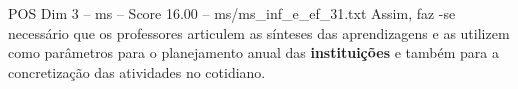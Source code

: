 \begin{textsample}{POS Dim 3 – ms – Score 16.00 – ms/ms\_inf\_e\_ef\_31.txt}
Assim, faz -se necessário que os professores articulem as sínteses das aprendizagens e as utilizem como parâmetros para o planejamento anual das \textbf{instituições} e também para a concretização das atividades no cotidiano.

\end{textsample}
